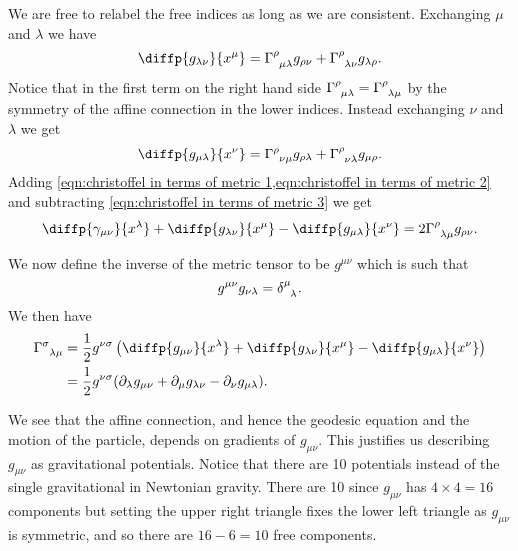 \documentclass[fleqn]{NotesClass}
\newcommand*{\christoffel}[3]{\tensor{\Gamma}{^{#1}_{{#2}{#3}}}}
\begin{document}
    We are free to relabel the free indices as long as we are consistent.
    Exchanging \(\mu\) and \(\lambda\) we have
    \begin{equation}
        \diffp{g_{\lambda\nu}}{x^\mu} = \christoffel{\rho}{\mu}{\lambda} g_{\rho\nu} + \christoffel{\rho}{\lambda}{\nu} g_{\lambda\rho}.\label{eqn:christoffel in terms of metric 2}
    \end{equation}
    Notice that in the first term on the right hand side \(\christoffel{\rho}{\mu}{\lambda} = \christoffel{\rho}{\lambda}{\mu}\) by the symmetry of the affine connection in the lower indices.
    Instead exchanging \(\nu\) and \(\lambda\) we get
    \begin{equation}
        \diffp{g_{\mu\lambda}}{x^\nu} = \christoffel{\rho}{\nu}{\mu} g_{\rho \lambda} + \christoffel{\rho}{\nu}{\lambda} g_{\mu\rho}.\label{eqn:christoffel in terms of metric 3}
    \end{equation}
    Adding \cref{eqn:christoffel in terms of metric 1,eqn:christoffel in terms of metric 2} and subtracting \cref{eqn:christoffel in terms of metric 3} we get
    \begin{equation}
        \diffp{\gamma_{\mu\nu}}{x^\lambda} + \diffp{g_{\lambda\nu}}{x^\mu} - \diffp{g_{\mu\lambda}}{x^\nu} = 2\christoffel{\rho}{\lambda}{\mu}g_{\rho\nu}.
    \end{equation}
    
    We now define the inverse of the metric tensor to be \(g^{\mu\nu}\) which is such that
    \begin{equation}
        g^{\mu\nu}g_{\nu\lambda} = \tensor{\delta}{^\mu_\lambda}.
    \end{equation}
    We then have
    \begin{align}
        \christoffel{\sigma}{\lambda}{\mu} &= \frac{1}{2}g^{\nu\sigma} \left( \diffp{g_{\mu\nu}}{x^\lambda} + \diffp{g_{\lambda\nu}}{x^\mu} - \diffp{g_{\mu\lambda}}{x^\nu} \right)\\
        &= \frac{1}{2}g^{\nu\sigma} (\partial_\lambda g_{\mu\nu} + \partial_\mu g_{\lambda\nu} - \partial_\nu g_{\mu\lambda}).
    \end{align}
    
    We see that the affine connection, and hence the geodesic equation and the motion of the particle, depends on gradients of \(g_{\mu\nu}\).
    This justifies us describing \(g_{\mu\nu}\) as gravitational potentials.
    Notice that there are 10 potentials instead of the single gravitational in Newtonian gravity.
    There are 10 since \(g_{\mu\nu}\) has \(4\times 4 = 16\) components but setting the upper right triangle fixes the lower left triangle as \(g_{\mu\nu}\) is symmetric, and so there are \(16 - 6 = 10\) free components.
    
\end{document}
